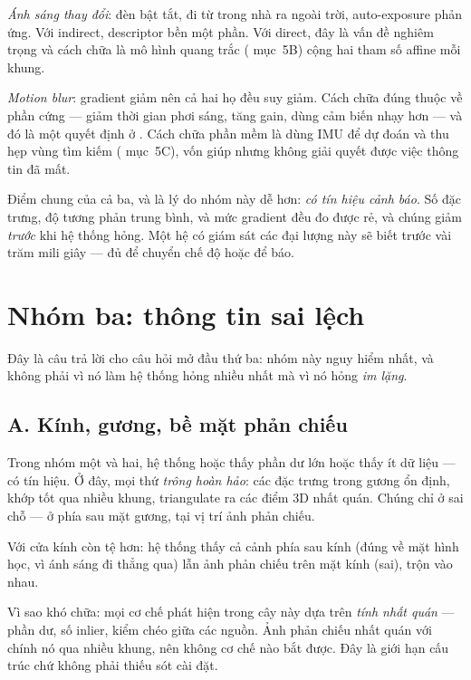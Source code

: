 \documentclass[../../vslam.tex]{subfiles}
\begin{document}
\emph{Ánh sáng thay đổi}: đèn bật tắt, đi từ trong nhà ra ngoài trời, auto-exposure phản ứng. Với indirect, descriptor bền một phần. Với direct, đây là vấn đề nghiêm trọng và cách chữa là mô hình quang trắc ( mục~5B) cộng hai tham số affine mỗi khung.

\emph{Motion blur}: gradient giảm nên cả hai họ đều suy giảm. Cách chữa đúng thuộc về phần cứng --- giảm thời gian phơi sáng, tăng gain, dùng cảm biến nhạy hơn --- và đó là một quyết định ở . Cách chữa phần mềm là dùng IMU để dự đoán và thu hẹp vùng tìm kiếm ( mục~5C), vốn giúp nhưng không giải quyết được việc thông tin đã mất.

Điểm chung của cả ba, và là lý do nhóm này dễ hơn: \emph{có tín hiệu cảnh báo}. Số đặc trưng, độ tương phản trung bình, và mức gradient đều đo được rẻ, và chúng giảm \emph{trước} khi hệ thống hỏng. Một hệ có giám sát các đại lượng này sẽ biết trước vài trăm mili giây --- đủ để chuyển chế độ hoặc để báo.

\section{Nhóm ba: thông tin sai lệch}

Đây là câu trả lời cho câu hỏi mở đầu thứ ba: nhóm này nguy hiểm nhất, và không phải vì nó làm hệ thống hỏng nhiều nhất mà vì nó hỏng \emph{im lặng}.

\subsection{A. Kính, gương, bề mặt phản chiếu}

Trong nhóm một và hai, hệ thống hoặc thấy phần dư lớn hoặc thấy ít dữ liệu --- có tín hiệu. Ở đây, mọi thứ \emph{trông hoàn hảo}: các đặc trưng trong gương ổn định, khớp tốt qua nhiều khung, triangulate ra các điểm \(3\)D nhất quán. Chúng chỉ ở sai chỗ --- ở phía sau mặt gương, tại vị trí ảnh phản chiếu.

Với cửa kính còn tệ hơn: hệ thống thấy cả cảnh phía sau kính (đúng về mặt hình học, vì ánh sáng đi thẳng qua) lẫn ảnh phản chiếu trên mặt kính (sai), trộn vào nhau.

Vì sao khó chữa: mọi cơ chế phát hiện trong cây này dựa trên \emph{tính nhất quán} --- phần dư, số inlier, kiểm chéo giữa các nguồn. Ảnh phản chiếu nhất quán với chính nó qua nhiều khung, nên không cơ chế nào bắt được. Đây là giới hạn cấu trúc chứ không phải thiếu sót cài đặt.
\end{document}
